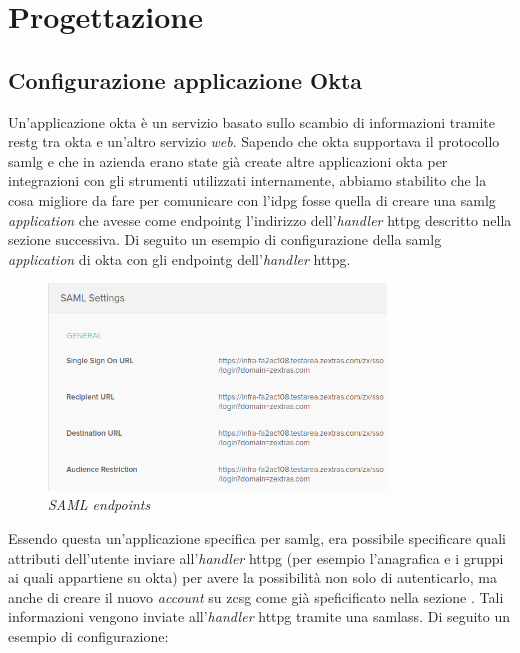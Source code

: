 \section{Progettazione}
\subsection{Configurazione applicazione Okta}
Un'applicazione \gls{okta} è un servizio basato sullo scambio di informazioni tramite \gls{restg} tra \gls{okta} e un'altro servizio \textit{web}. Sapendo che \gls{okta} supportava il protocollo \gls{samlg} e che in azienda erano state già create altre applicazioni \gls{okta} per integrazioni con gli strumenti utilizzati internamente, abbiamo stabilito che la cosa migliore da fare per comunicare con l'\gls{idpg} fosse quella di creare una \gls{samlg} \textit{application} che avesse come \gls{endpointg} l'indirizzo dell'\textit{handler} \gls{httpg} descritto nella sezione successiva.
Di seguito un esempio di configurazione della \gls{samlg} \textit{application} di \gls{okta} con gli \gls{endpointg} dell'\textit{handler} \gls{httpg}.

    \begin{figure}[ht]
        \centering
        \includegraphics[width=0.8\textwidth]{immagini/endpoints.png}
        \caption{\textit{SAML endpoints}}
        \label{fig: SAML endpoints}
    \end{figure}
    
Essendo questa un'applicazione specifica per \gls{samlg}, era possibile specificare quali attributi dell'utente inviare all'\textit{handler } \gls{httpg} (per esempio l'anagrafica e i gruppi ai quali appartiene su \gls{okta}) per avere la possibilità non solo di autenticarlo, ma anche di creare il nuovo \textit{account} su \gls{zcsg} come già speficificato nella sezione . Tali informazioni vengono inviate all'\textit{handler} \gls{httpg} tramite una \gls{samlass}. Di seguito un esempio di configurazione:

